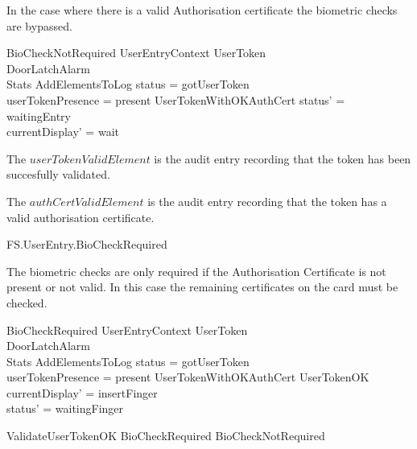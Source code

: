 In the case where there is a
valid Authorisation certificate the biometric checks are bypassed.

\begin{schema}{BioCheckNotRequired}
        UserEntryContext
\also
        \Xi UserToken
\\      \Xi DoorLatchAlarm        
\\      \Xi Stats
\also
        AddElementsToLog
\where
        status = gotUserToken
\\      userTokenPresence = present
\also
        UserTokenWithOKAuthCert
\also
        status' = waitingEntry
\\      currentDisplay' = wait
\end{schema}
\begin{Zcomment}
\item
The $userTokenValidElement$ is the audit entry recording that the
token has been succesfully validated.
\item 
The $authCertValidElement$ is the audit entry recording that the
token has a valid authorisation certificate.
\end{Zcomment}


\begin{traceunit}{FS.UserEntry.BioCheckRequired}
\end{traceunit}


The biometric checks are only required if the Authorisation
Certificate is not present or not valid. In this case the remaining
certificates on the card must be checked.



\begin{schema}{BioCheckRequired}
        UserEntryContext
\also
        \Xi UserToken
\\      \Xi DoorLatchAlarm        
\\      \Xi Stats
\also
        AddElementsToLog
\where
        status = gotUserToken
\\      userTokenPresence = present
\also
        \lnot UserTokenWithOKAuthCert \land UserTokenOK
\also
	currentDisplay' = insertFinger
\\	status' = waitingFinger
\end{schema}


\begin{zed}
ValidateUserTokenOK  BioCheckRequired \lor BioCheckNotRequired
\end{zed}

